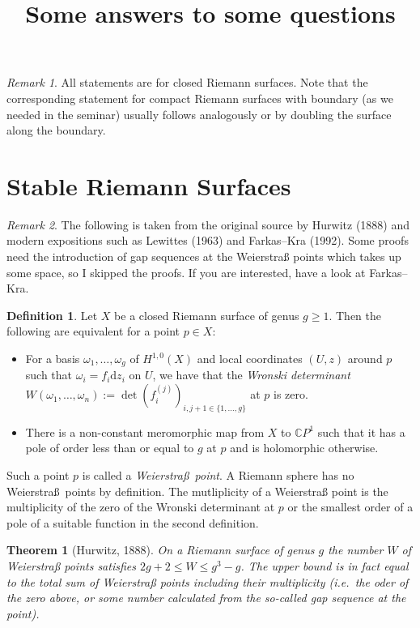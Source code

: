 \documentclass[a4paper]{article}
\title{Some answers to some questions}
\newcommand{\CC}{\mathbb{C}}
\newcommand{\dd}{\mathrm{d}}
\newtheorem*{thm}{Theorem}
\theoremstyle{definition}
\newtheorem*{definition}{Definition}
\theoremstyle{remark}
\newtheorem*{rmk}{Remark}
\theoremstyle{remark}
\begin{document}
\maketitle

\begin{rmk}
  All statements are for closed Riemann surfaces. Note that the corresponding statement for compact Riemann surfaces with boundary (as we needed in the seminar) usually follows analogously or by doubling the surface along the boundary.
\end{rmk}

\section*{Stable Riemann Surfaces}

\begin{rmk}
The following is taken from the original source by Hurwitz (1888) and modern expositions such as Lewittes (1963) and Farkas--Kra (1992). Some proofs need the introduction of gap sequences at the Weierstraß points which takes up some space, so I skipped the proofs. If you are interested, have a look at Farkas--Kra.
\end{rmk}

\begin{definition}
Let $X$ be a closed Riemann surface of genus $g\geq 1$. Then the following are equivalent for a point $p\in X$:

\begin{itemize}
\item For a basis $\omega_1,\ldots,\omega_g$ of $H^{1,0}(X)$ and local coordinates $(U,z)$ around $p$ such that $\omega_i=f_i\dd z_i$ on $U$, we have that the \emph{Wronski determinant} $W(\omega_1,\ldots,\omega_n):=\det(f^{(j)}_i)_{i,j+1\in\{1,\ldots,g\}}$ at $p$ is zero.
\item There is a non-constant meromorphic map from $X$ to $\CC P^1$ such that it has a pole of order less than or equal to $g$ at $p$ and is holomorphic otherwise.
\end{itemize}

Such a point $p$ is called a \emph{Weierstra\ss\ point}. A Riemann sphere has no Weierstra\ss\ points by definition. The mutliplicity of a Weierstraß point is the multiplicity of the zero of the Wronski determinant at $p$ or the smallest order of a pole of a suitable function in the second definition.
\end{definition}

\begin{thm}[Hurwitz, 1888]
On a Riemann surface of genus $g$ the number $W$ of Weierstraß points satisfies $2g+2\leq W\leq g^3-g$. The upper bound is in fact equal to the total sum of Weierstraß points including their multiplicity (i.e.\ the oder of the zero above, or some number calculated from the so-called gap sequence at the point).
\end{thm}
\end{document}
